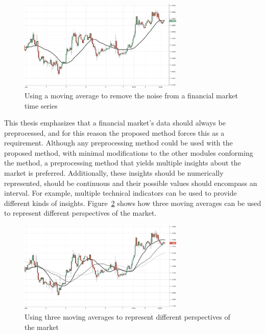 \begin{figure}
  \centering
  \includegraphics[width=0.7\textwidth]{img/moving-average.png}
  \caption{Using a moving average to remove the noise from a financial market time
  series}
  \label{figure:moving-average-noise}
\end{figure}

This thesis emphasizes that a financial market's data should always be
preprocessed, and for this reason the proposed method forces this as a
requirement. Although any preprocessing method could be used with the proposed
method, with minimal modifications to the other modules conforming the method, a
preprocessing method that yields multiple insights about the market is
preferred. Additionally, these insights should be numerically represented,
should be continuous and their possible values should encompass an interval. For
example, multiple technical indicators can be used to provide different kinds of
insights. Figure~\ref{figure:multiple-technical-indicators} shows how three
moving averages can be used to represent different perspectives of the market.

\begin{figure}
\centering
\includegraphics[width=0.7\textwidth]{img/multiple-technical-indicators.png}
\caption{Using three moving averages to represent different perspectives of the
  market}
\label{figure:multiple-technical-indicators}
\end{figure}

